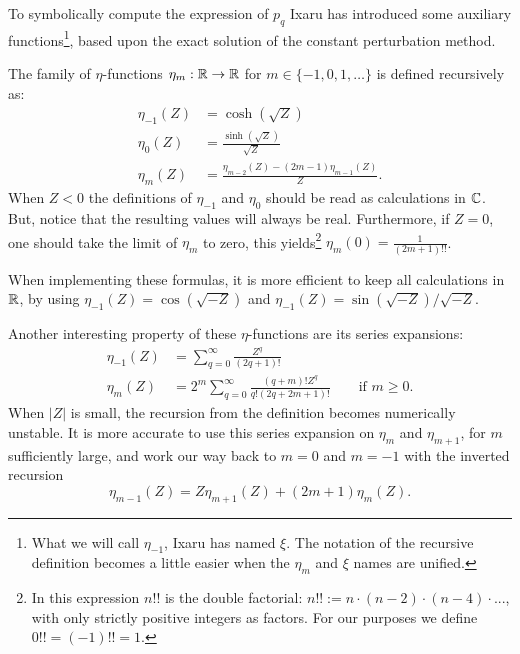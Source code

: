 To symbolically compute the expression of $p_q$ Ixaru has introduced some auxiliary functions\footnote{What we will call $\eta_{-1}$, Ixaru has named $\xi$. The notation of the recursive definition becomes a little easier when the $\eta_m$ and $\xi$ names are unified.}, based upon the exact solution of the constant perturbation method.

\begin{definition}[Ixaru 1984]\label{def:c2_eta_functions}
    The family of $\eta$-functions $\eta_m : \mathbb{R} \to \mathbb{R}$ for $m \in \{-1, 0, 1, \dots\}$ is defined recursively as:
    \begin{align*}
        \eta_{-1}(Z) & = \cosh(\sqrt{Z})                                        \\
        \eta_{0}(Z)  & = \frac{\sinh(\sqrt{Z})}{\sqrt{Z}}                       \\
        \eta_{m}(Z)  & = \frac{\eta_{m-2}(Z) - (2m-1) \eta_{m-1}(Z)}{Z}\text{.}
    \end{align*}
    When $Z < 0$ the definitions of $\eta_{-1}$ and $\eta_{0}$ should be read as calculations in $\mathbb{C}$. But, notice that the resulting values will always be real. Furthermore, if $Z = 0$, one should take the limit of $\eta_m$ to zero, this yields\footnote{In this expression $n!!$ is the double factorial: $n!! := n\cdot (n-2) \cdot (n - 4) \cdot ...$, with only strictly positive integers as factors. For our purposes we define $0!! = (-1)!! = 1$.} $\eta_m(0) = \frac{1}{(2m+1)!!}$.
\end{definition}

When implementing these formulas, it is more efficient to keep all calculations in $\mathbb{R}$, by using $\eta_{-1}(Z) = \cos(\sqrt{-Z})$ and $\eta_{-1}(Z) = \sin(\sqrt{-Z})/\sqrt{-Z}$.

Another interesting property of these $\eta$-functions are its series expansions:\begin{align*}
    \eta_{-1}(Z) & = \sum_{q=0}^{\infty} \frac{Z^q}{(2q + 1)!}                                                      \\
    \eta_{m}(Z)  & = 2^m \sum_{q=0}^{\infty} \frac{(q+m)! Z^q}{q!(2q + 2m + 1)!} \qquad \text{if } m \geq 0\text{.}
\end{align*}
When $|Z|$ is small, the recursion from the definition becomes numerically unstable. It is more accurate to use this series expansion on $\eta_m$ and $\eta_{m+1}$, for $m$ sufficiently large, and work our way back to $m=0$ and $m=-1$ with the inverted recursion
$$
    \eta_{m-1}(Z) = Z \eta_{m+1}(Z) + (2 m + 1) \eta_{m}(Z)
    \text{.}
$$


